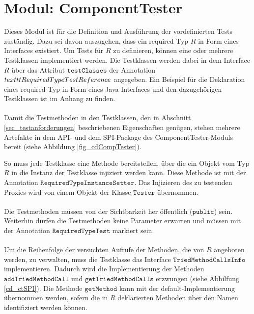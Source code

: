\section{Modul: ComponentTester}
Dieses Modul ist für die Definition und Ausführung der vordefinierten Tests zuständig. Dazu sei davon auszugehen, dass ein required Typ $R$ in Form eines Interfaces existiert. Um Tests für $R$ zu definieren, können eine oder mehrere Testklassen implementiert werden. Die Testklassen werden dabei in dem Interface $R$ über das Attribut $\texttt{testClasses}$ der Annotation $\\texttt{RequiredTypeTestReference}$ angegeben. Ein Beispiel für die Deklaration eines required Typ in Form eines Java-Interfaces und den dazugehörigen Testklassen ist im Anhang zu finden.
\\\\
Damit die Testmethoden in den Testklassen, den in Abschnitt \ref{sec_testanforderungen} beschriebenen Eigenschaften genügen, stehen mehrere Artefakte in dem API- und dem SPI-Package des ComponentTester-Moduls bereit (siehe Abbildung \ref{fig_cdCompTester}).
\begin{figure}

\end{figure}\label{fig_cdCompTester}
\noindent
So muss jede Testklasse eine Methode bereitstellen, über die ein Objekt vom Typ $R$ in die Instanz der Testklasse injiziert werden kann. Diese Methode ist mit der Annotation $\texttt{RequiredTypeInstanceSetter}$. Das Injizieren des zu testenden Proxies wird von einem Objekt der Klasse $\texttt{Tester}$ übernommen.
\\\\
Die Testmethoden müssen von der Sichtbarkeit her öffentlich ($\texttt{public}$) sein. Weiterhin dürfen die Testmethoden keine Parameter erwarten und müssen mit der Annotation $\texttt{RequiredTypeTest}$ markiert sein. %
\\\\
Um die Reihenfolge der versuchten Aufrufe der Methoden, die von $R$ angeboten werden, zu verwalten, muss die Testklasse das Interface $\texttt{TriedMethodCallsInfo}$ implementieren. Dadurch wird die Implementierung der Methoden $\texttt{addTriedMethodCall}$ und $\texttt{getTriedMethodCalls}$ erzwungen (siehe Abbilfung \ref{cd_ctSPI}). Die Methode $\texttt{getMethod}$ kann mit der default-Implementierung übernommen werden, sofern die in $R$ deklarierten Methoden über den Namen identifiziert werden können.
\begin{figure}

\end{figure}\label{cd_ctSPI}
